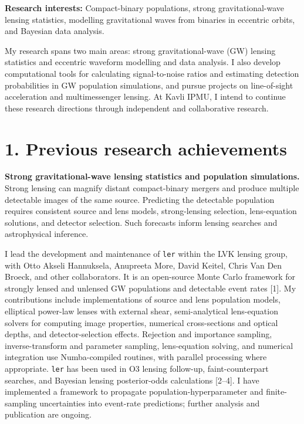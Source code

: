\documentclass[11pt]{article}
\newcommand{\firstheading}[2]{\thispagestyle{plain}{\LARGE\bfseries\color{accent}#1}\par\vspace{3pt}{#2}\par\vspace{4pt}{\color{accent}\hrule}\vspace{7pt}}
\begin{document}
\firstheading{Statement of research interests}{Phurailatpam Hemantakumar\quad|\quad Kavli IPMU (PD2026)}
\textbf{Research interests:} Compact-binary populations, strong gravitational-wave lensing statistics, modelling gravitational waves from binaries in eccentric orbits, and Bayesian data analysis.

My research spans two main areas: strong gravitational-wave (GW) lensing statistics and eccentric waveform modelling and data analysis. I also develop computational tools for calculating signal-to-noise ratios and estimating detection probabilities in GW population simulations, and pursue projects on line-of-sight acceleration and multimessenger lensing. At Kavli IPMU, I intend to continue these research directions through independent and collaborative research.

\section*{1. Previous research achievements}
\textbf{Strong gravitational-wave lensing statistics and population simulations.} Strong lensing can magnify distant compact-binary mergers and produce multiple detectable images of the same source. Predicting the detectable population requires consistent source and lens models, strong-lensing selection, lens-equation solutions, and detector selection. Such forecasts inform lensing searches and astrophysical inference.

I lead the development and maintenance of \texttt{ler} within the LVK lensing group, with Otto Akseli Hannuksela, Anupreeta More, David Keitel, Chris Van Den Broeck, and other collaborators. It is an open-source Monte Carlo framework for strongly lensed and unlensed GW populations and detectable event rates [1]. My contributions include implementations of source and lens population models, elliptical power-law lenses with external shear, semi-analytical lens-equation solvers for computing image properties, numerical cross-sections and optical depths, and detector-selection effects. Rejection and importance sampling, inverse-transform and parameter sampling, lens-equation solving, and numerical integration use Numba-compiled routines, with parallel processing where appropriate. \texttt{ler} has been used in O3 lensing follow-up, faint-counterpart searches, and Bayesian lensing posterior-odds calculations [2--4]. I have implemented a framework to propagate population-hyperparameter and finite-sampling uncertainties into event-rate predictions; further analysis and publication are ongoing.
\end{document}
